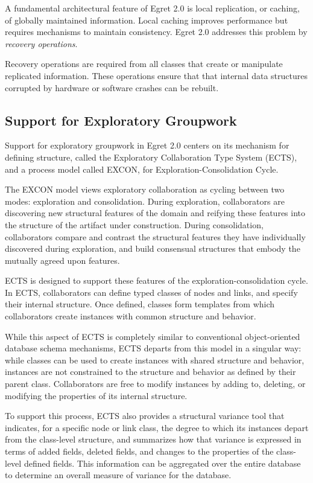 A fundamental architectural feature of Egret 2.0 is local replication,
or caching, of globally maintained information.  Local caching
improves performance but requires mechanisms to maintain consistency.
Egret 2.0 addresses this problem by {\em recovery operations}. 

Recovery operations are required from all classes that create or
manipulate replicated information.  These operations ensure that that
internal data structures corrupted by hardware or software crashes can
be rebuilt.  


\subsection{Support for Exploratory Groupwork}

Support for exploratory groupwork in Egret 2.0 centers on its
mechanism for defining structure, called the Exploratory
Collaboration Type System (ECTS), and a process model called EXCON, for 
Exploration-Consolidation Cycle.

The EXCON model views exploratory collaboration as cycling between two
modes: exploration and consolidation.  During exploration,
collaborators are discovering new structural features of the domain
and reifying these features into the structure of the artifact under
construction.  During consolidation, collaborators compare and
contrast the structural features they have individually discovered
during exploration, and build consensual structures that embody the
mutually agreed upon features.

ECTS is designed to support these features of the
exploration-consolidation cycle.  In ECTS, collaborators can define
typed classes of nodes and links, and specify their internal
structure.  Once defined, classes form templates from which
collaborators create instances with common structure and behavior.

While this aspect of ECTS is completely similar to conventional
object-oriented database schema mechanisms, ECTS departs from this
model in a singular way: while classes can be used to create instances
with shared structure and behavior, instances are not constrained
to the structure and behavior as defined by their parent class.
Collaborators are free to modify instances by adding to, deleting, or
modifying the properties of its internal structure.

To support this process, ECTS also provides a structural variance tool
that indicates, for a specific node or link class, the degree to which
its instances depart from the class-level structure, and summarizes
how that variance is expressed in terms of added fields, deleted
fields, and changes to the properties of the class-level defined
fields.  This information can be aggregated over the entire database
to determine an overall measure of variance for the database.

